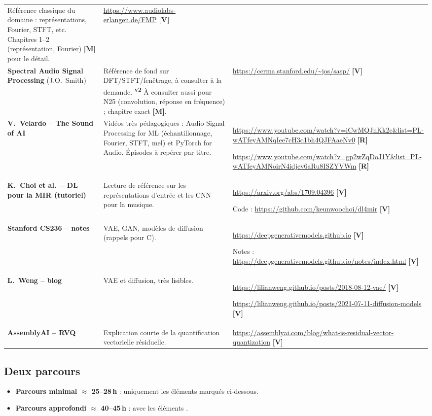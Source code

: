 \documentclass[11pt,a4paper]{article}
\providecommand{\og}{\guillemotleft\nobreakspace}%
\providecommand{\fg}{\nobreakspace\guillemotright}}
\newcommand{\sS}{\ding{72}}   %
\newcommand{\sO}{\ding{73}}   %
\newcommand{\vtwo}{\textsuperscript{\textcolor{orange!80!black}{\textbf{v2}}}}
\newcommand{\lV}{\textbf{\textcolor{green!45!black}{[V]}}}
\newcommand{\lR}{\textbf{\textcolor{orange!80!black}{[R]}}}
\newcommand{\lM}{\textbf{\textcolor{red!70!black}{[M]}}}
\begin{document}
{\begin{longtable}{L{2.9cm}L{7.3cm}L{5.1cm}}
Référence \og{}classique\fg{} du domaine : représentations, Fourier, STFT, etc. Chapitres 1--2 (représentation, Fourier) \lM{} pour le détail. &
\url{https://www.audiolabs-erlangen.de/FMP} \lV\\
\addlinespace
\textbf{Spectral Audio Signal Processing} (J.O.\ Smith) &
Référence de fond sur DFT/STFT/fenêtrage, à consulter à la demande. \vtwo{} À consulter aussi pour N25 (convolution, réponse en fréquence) ; chapitre exact \lM. &
\url{https://ccrma.stanford.edu/~jos/sasp/} \lV\\
\addlinespace
\textbf{V.\ Velardo -- The Sound of AI} &
Vidéos très pédagogiques : \og{}Audio Signal Processing for ML\fg{} (échantillonnage, Fourier, STFT, mel) et \og{}PyTorch for Audio\fg{}. Épisodes à repérer par titre. &
\url{https://www.youtube.com/watch?v=iCwMQJnKk2c&list=PL-wATfeyAMNqIee7cH3q1bh4QJFAaeNv0} \lR\par \url{https://www.youtube.com/watch?v=gp2wZqDoJ1Y&list=PL-wATfeyAMNoirN4idjev6aRu8ISZYVWm} \lR\\
\addlinespace
\textbf{K.\ Choi et al.\ -- DL pour la MIR (tutoriel)} &
Lecture de référence sur les représentations d'entrée et les CNN pour la musique. &
\url{https://arxiv.org/abs/1709.04396} \lV\par Code : \url{https://github.com/keunwoochoi/dl4mir} \lV\\
\addlinespace
\textbf{Stanford CS236 -- notes} &
VAE, GAN, modèles de diffusion (rappels pour C). &
\url{https://deepgenerativemodels.github.io} \lV\par Notes : \url{https://deepgenerativemodels.github.io/notes/index.html} \lV\\
\addlinespace
\textbf{L.\ Weng -- blog} &
VAE et diffusion, très lisibles. &
\url{https://lilianweng.github.io/posts/2018-08-12-vae/} \lV\par \url{https://lilianweng.github.io/posts/2021-07-11-diffusion-models} \lV\\
\addlinespace
\textbf{AssemblyAI -- RVQ} &
Explication courte de la quantification vectorielle résiduelle. &
\url{https://assemblyai.com/blog/what-is-residual-vector-quantization} \lV\\
\end{longtable}}

\subsection{Deux parcours}
\begin{itemize}
\item \textbf{Parcours minimal $\approx$ 25--28\,h} : uniquement les éléments marqués \textbf{\sS} ci-dessous.
\item \textbf{Parcours approfondi $\approx$ 40--45\,h} : avec les éléments \textbf{\sO}.
\end{itemize}
\end{document}
